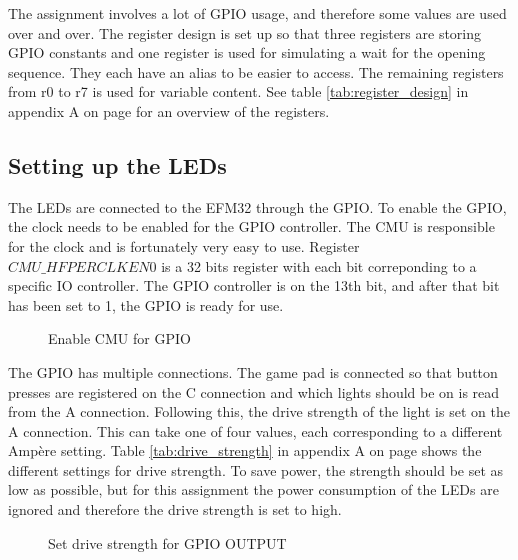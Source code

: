 The assignment involves a lot of GPIO usage, and therefore some values are used over and over. The register design is set up so that three registers are storing GPIO constants and one register is used for simulating a wait for the opening sequence. They each have an alias to be easier to access. The remaining registers from r0 to r7 is used for variable content. See table \ref{tab:register_design} in appendix A on page \pageref{tab:register_design} for an overview of the registers.

\subsection{Setting up the LEDs}
\label{subsec:dev_pros_setup_led}

The LEDs are connected to the EFM32 through the GPIO. To enable the GPIO, the clock needs to be enabled for the GPIO controller. The CMU is responsible for the clock and is fortunately very easy to use. Register $CMU\_HFPERCLKEN0$ is a 32 bits register with each bit correponding to a specific IO controller. The GPIO controller is on the 13th bit, and after that bit has been set to 1, the GPIO is ready for use.

\begin{figure}[h!]
\caption{Enable CMU for GPIO}
\label{code:enable_cmu_gpio}
\end{figure}

The GPIO has multiple connections. The game pad is connected so that button presses are registered on the C connection and which lights should be on is read from the A connection. Following this, the drive strength of the light is set on the A connection. This can take one of four values, each corresponding to a different Ampère setting. Table \ref{tab:drive_strength} in appendix A on page \pageref{tab:drive_strength} shows the different settings for drive strength. To save power, the strength should be set as low as possible, but for this assignment the power consumption of the LEDs are ignored and therefore the drive strength is set to high.

\begin{figure}[h!]
\caption{Set drive strength for GPIO OUTPUT}
\label{code:set_drive_gpio_o}
\end{figure}

